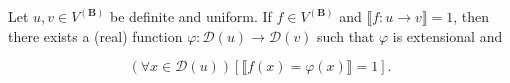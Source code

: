 Let $u, v \in V^{(\mathbf{B})}$ be definite and uniform. If $f \in V^{(\mathbf{B})}$ and $\llbracket f: u \rightarrow v \rrbracket = 1$, then there exists a (real) function $\varphi: \mathcal{D}(u) \rightarrow \mathcal{D}(v)$ such that $\varphi$ is extensional and

$$(\forall x \in \mathcal{D}(u))[\llbracket f(x) = \varphi(x) \rrbracket = 1].$$
